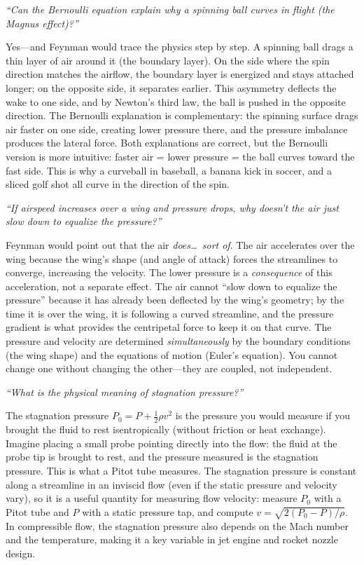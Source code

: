 \textit{``Can the Bernoulli equation explain why a spinning ball curves in flight (the Magnus effect)?''}

Yes---and Feynman would trace the physics step by step. A spinning ball drags a thin layer of air around it (the boundary layer). On the side where the spin direction matches the airflow, the boundary layer is energized and stays attached longer; on the opposite side, it separates earlier. This asymmetry deflects the wake to one side, and by Newton's third law, the ball is pushed in the opposite direction. The Bernoulli explanation is complementary: the spinning surface drags air faster on one side, creating lower pressure there, and the pressure imbalance produces the lateral force. Both explanations are correct, but the Bernoulli version is more intuitive: faster air = lower pressure = the ball curves toward the fast side. This is why a curveball in baseball, a banana kick in soccer, and a sliced golf shot all curve in the direction of the spin.

\textit{``If airspeed increases over a wing and pressure drops, why doesn't the air just slow down to equalize the pressure?''}

Feynman would point out that the air \emph{does\ldots\ sort of}. The air accelerates over the wing because the wing's shape (and angle of attack) forces the streamlines to converge, increasing the velocity. The lower pressure is a \emph{consequence} of this acceleration, not a separate effect. The air cannot ``slow down to equalize the pressure'' because it has already been deflected by the wing's geometry; by the time it is over the wing, it is following a curved streamline, and the pressure gradient is what provides the centripetal force to keep it on that curve. The pressure and velocity are determined \emph{simultaneously} by the boundary conditions (the wing shape) and the equations of motion (Euler's equation). You cannot change one without changing the other---they are coupled, not independent.

\textit{``What is the physical meaning of stagnation pressure?''}

The stagnation pressure $P_0 = P + \frac{1}{2}\rho v^2$ is the pressure you would measure if you brought the fluid to rest isentropically (without friction or heat exchange). Imagine placing a small probe pointing directly into the flow: the fluid at the probe tip is brought to rest, and the pressure measured is the stagnation pressure. This is what a Pitot tube measures. The stagnation pressure is constant along a streamline in an inviscid flow (even if the static pressure and velocity vary), so it is a useful quantity for measuring flow velocity: measure $P_0$ with a Pitot tube and $P$ with a static pressure tap, and compute $v = \sqrt{2(P_0 - P)/\rho}$. In compressible flow, the stagnation pressure also depends on the Mach number and the temperature, making it a key variable in jet engine and rocket nozzle design.

